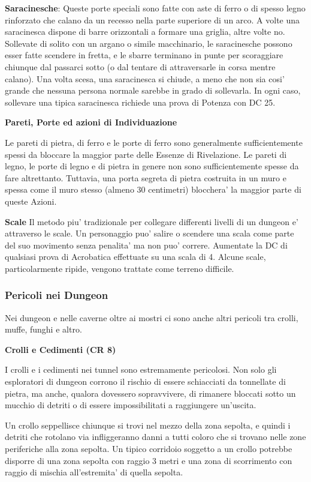 \documentclass[a4paper,11pt,twoside,openany]{book}
\begin{document}
{\textbf{Saracinesche}: Queste porte speciali sono fatte con aste di ferro o di spesso legno rinforzato che calano da un recesso nella parte superiore di un arco. A volte una saracinesca dispone di barre orizzontali a formare una griglia, altre volte no. Sollevate di solito con un argano o simile macchinario, le saracinesche possono esser fatte scendere in fretta, e le sbarre terminano in punte per scoraggiare chiunque dal passarci sotto (o dal tentare di attraversarle in corsa mentre calano). Una volta scesa, una saracinesca si chiude, a meno che non sia cosi' grande che nessuna persona normale sarebbe in grado di sollevarla. In ogni caso, sollevare una tipica saracinesca richiede una prova di Potenza con DC 25.

\textbf{Pareti, Porte ed azioni di Individuazione}

Le pareti di pietra, di ferro e le porte di ferro sono generalmente sufficientemente spessi da bloccare la maggior parte delle Essenze di Rivelazione. Le pareti di legno, le porte di legno e di pietra in genere non sono sufficientemente spesse da fare altrettanto. Tuttavia, una porta segreta di pietra costruita in un muro e spessa come il muro stesso (almeno 30 centimetri) blocchera' la maggior parte di queste Azioni.

\textbf{Scale} Il metodo piu' tradizionale per collegare differenti livelli di un dungeon e' attraverso le scale. Un personaggio puo' salire o scendere una scala come parte del suo movimento senza penalita' ma non puo' correre. Aumentate la DC di qualsiasi prova di Acrobatica effettuate su una scala di 4. Alcune scale, particolarmente ripide, vengono trattate come terreno difficile.

\subsubsection{Pericoli nei Dungeon}

Nei dungeon e nelle caverne oltre ai mostri ci sono anche altri pericoli tra crolli, muffe, funghi e altro.

\textbf{Crolli e Cedimenti (CR 8)}

I crolli e i cedimenti nei tunnel sono estremamente pericolosi. Non solo gli esploratori di dungeon corrono il rischio di essere schiacciati da tonnellate di pietra, ma anche, qualora dovessero sopravvivere, di rimanere bloccati sotto un mucchio di detriti o di essere impossibilitati a raggiungere un'uscita.

Un crollo seppellisce chiunque si trovi nel mezzo della zona sepolta, e quindi i detriti che rotolano via infliggeranno danni a tutti coloro che si trovano nelle zone periferiche alla zona sepolta. Un tipico corridoio soggetto a un crollo potrebbe disporre di una zona sepolta con raggio 3 metri e una zona di scorrimento con raggio di mischia all'estremita' di quella sepolta.

}
\end{document}
